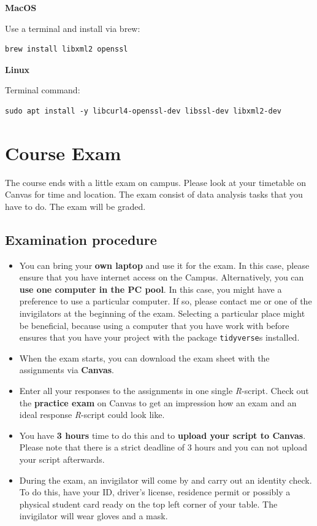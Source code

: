 \documentclass[
]{scrartcl}
\providecommand{\tightlist}{%
  \setlength{\itemsep}{0pt}\setlength{\parskip}{0pt}}
\begin{document}
\textbf{MacOS}

Use a terminal and install via brew:

\begin{verbatim}
brew install libxml2 openssl
\end{verbatim}

\textbf{Linux}

Terminal command:

\begin{verbatim}
sudo apt install -y libcurl4-openssl-dev libssl-dev libxml2-dev
\end{verbatim}

\hypertarget{course-exam}{%
\section{Course Exam}\label{course-exam}}

The course ends with a little exam on campus. Please look at your timetable on Canvas for time and location. The exam consist of data analysis tasks that you have to do. The exam will be graded.

\hypertarget{examination-procedure}{%
\subsection*{Examination procedure}\label{examination-procedure}}

\begin{itemize}
\tightlist
\item
  You can bring your \textbf{own laptop} and use it for the exam. In this case, please ensure that you have internet access on the Campus. Alternatively, you can \textbf{use one computer in the PC pool}. In this case, you might have a preference to use a particular computer. If so, please contact me or one of the invigilators at the beginning of the exam. Selecting a particular place might be beneficial, because using a computer that you have work with before ensures that you have your project with the package \texttt{tidyverse}s installed.
\item
  When the exam starts, you can download the exam sheet with the assignments via \textbf{Canvas}.
\item
  Enter all your responses to the assignments in one single \emph{R}-script. Check out the \textbf{practice exam} on Canvas to get an impression how an exam and an ideal response \emph{R}-script could look like.
\item
  You have \textbf{3 hours} time to do this and to \textbf{upload your script to Canvas}. Please note that there is a strict deadline of 3 hours and you can not upload your script afterwards.
\item
  During the exam, an invigilator will come by and carry out an identity check. To do this, have your ID, driver's license, residence permit or possibly a physical student card ready on the top left corner of your table. The invigilator will wear gloves and a mask.
\end{itemize}
\end{document}

